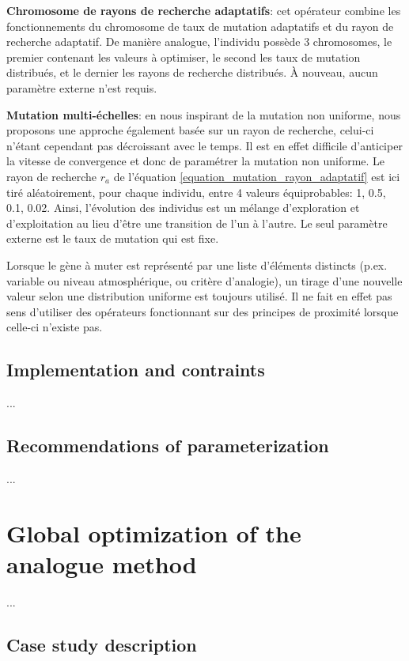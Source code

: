 \documentclass{ametsoc}
\begin{document}
	
	\item \textbf{Chromosome de rayons de recherche adaptatifs}: cet opérateur combine les fonctionnements du chromosome de taux de mutation adaptatifs et du rayon de recherche adaptatif. De manière analogue, l'individu possède 3 chromosomes, le premier contenant les valeurs à optimiser, le second les taux de mutation distribués, et le dernier les rayons de recherche distribués. À nouveau, aucun paramètre externe n'est requis.
	
	
	\item \textbf{Mutation multi-échelles}: en nous inspirant de la mutation non uniforme, nous proposons une approche également basée sur un rayon de recherche, celui-ci n'étant cependant pas décroissant avec le temps. Il est en effet difficile d'anticiper la vitesse de convergence et donc de paramétrer la mutation non uniforme. Le rayon de recherche $r_{a}$ de l'équation \ref{equation_mutation_rayon_adaptatif} est ici tiré aléatoirement, pour chaque individu, entre 4 valeurs équiprobables: 1, 0.5, 0.1, 0.02. Ainsi, l'évolution des individus est un mélange d'exploration et d'exploitation au lieu d'être une transition de l'un à l'autre. Le seul paramètre externe est le taux de mutation qui est fixe.
	\vspace{2mm}
	

Lorsque le gène à muter est représenté par une liste d'éléments distincts (p.ex. variable ou niveau atmosphérique, ou critère d'analogie), un tirage d'une nouvelle valeur selon une distribution uniforme est toujours utilisé. Il ne fait en effet pas sens d'utiliser des opérateurs fonctionnant sur des principes de proximité lorsque celle-ci n'existe pas.





\subsection{Implementation and contraints}
...

\subsection{Recommendations of parameterization}
...


\section{Global optimization of the analogue method}
...

\subsection{Case study description}
\end{document}
